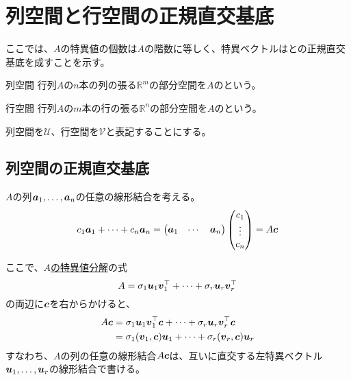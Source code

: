 \documentclass[../../../topic_linear-algebra]{subfiles}
\begin{document}
\sectionline
\section{列空間と行空間の正規直交基底}

ここでは、$A$の特異値の個数は$A$の階数に等しく、特異ベクトルはとの正規直交基底を成すことを示す。

\begin{definition}{列空間}
  行列$A$の$n$本の列の張る$\mathbb{R}^m$の部分空間を$A$のという。
\end{definition}

\begin{definition}{行空間}
  行列$A$の$m$本の行の張る$\mathbb{R}^n$の部分空間を$A$のという。
\end{definition}

列空間を$\mathcal{U}$、行空間を$\mathcal{V}$と表記することにする。

\subsection{列空間の正規直交基底}

$A$の列$\vb*{a}_1,\ldots,\vb*{a}_n$の任意の線形結合を考える。
\begin{equation*}
  c_1 \vb*{a}_1 + \cdots + c_n \vb*{a}_n = \begin{pmatrix}
    \vb*{a}_1 & \cdots & \vb*{a}_n
  \end{pmatrix} \begin{pmatrix}
    c_1    \\
    \vdots \\
    c_n
  \end{pmatrix} = A \vb*{c}
\end{equation*}

ここで、\hyperref[sec:svd-of-A]{$A$の特異値分解}の式
\begin{equation*}
  A = \sigma_1\vb*{u}_1\vb*{v}_1^\top + \cdots + \sigma_r \vb*{u}_r \vb*{v}_r^\top
\end{equation*}
の両辺に$\vb*{c}$を右からかけると、
\begin{align*}
  A \vb*{c} & = \sigma_1\vb*{u}_1\vb*{v}_1^\top \vb*{c} + \cdots + \sigma_r \vb*{u}_r \vb*{v}_r^\top \vb*{c} \\
            & = \sigma_1 (\vb*{v}_1, \vb*{c}) \vb*{u}_1 + \cdots + \sigma_r (\vb*{v}_r, \vb*{c}) \vb*{u}_r
\end{align*}
すなわち、$A$の列の任意の線形結合$A\vb*{c}$は、互いに直交する左特異ベクトル$\vb*{u}_1,\ldots,\vb*{u}_r$の線形結合で書ける。
\end{document}
